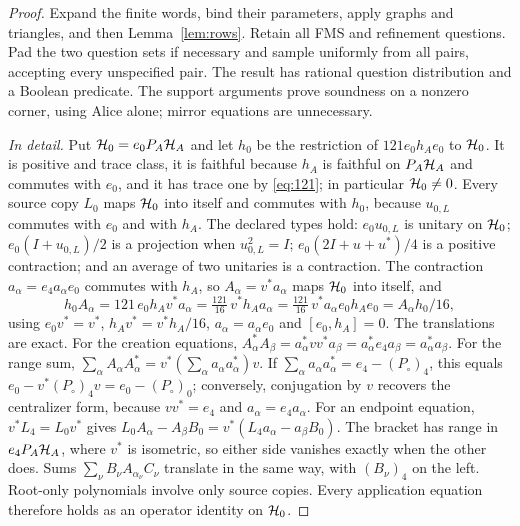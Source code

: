 \begin{proof}
Expand the finite words, bind their parameters, apply graphs and triangles, and then Lemma~\ref{lem:rows}. Retain all FMS and refinement questions. Pad the two question sets if necessary and sample uniformly from all pairs, accepting every unspecified pair. The result has rational question distribution and a Boolean predicate. The support arguments prove soundness on a nonzero corner, using Alice alone; mirror equations are unnecessary.

\emph{In detail.} Put $\mathcal H_0=e_0P_A\mathcal H_A$ and let $h_0$ be the restriction of $121e_0h_Ae_0$ to $\mathcal H_0$. It is positive and trace class, it is faithful because $h_A$ is faithful on $P_A\mathcal H_A$ and commutes with $e_0$, and it has trace one by \eqref{eq:121}; in particular $\mathcal H_0\ne0$. Every source copy $L_0$ maps $\mathcal H_0$ into itself and commutes with $h_0$, because $u_{0,L}$ commutes with $e_0$ and with $h_A$. The declared types hold: $e_0u_{0,L}$ is unitary on $\mathcal H_0$; $e_0(I+u_{0,L})/2$ is a projection when $u_{0,L}^2=I$; $e_0(2I+u+u^*)/4$ is a positive contraction; and an average of two unitaries is a contraction. The contraction $a_\alpha=e_4a_\alpha e_0$ commutes with $h_A$, so $A_\alpha=v^*a_\alpha$ maps $\mathcal H_0$ into itself, and
\[
 h_0A_\alpha=121\,e_0h_Av^*a_\alpha=\tfrac{121}{16}\,v^*h_Aa_\alpha=\tfrac{121}{16}\,v^*a_\alpha e_0h_Ae_0=A_\alpha h_0/16,
\]
using $e_0v^*=v^*$, $h_Av^*=v^*h_A/16$, $a_\alpha=a_\alpha e_0$ and $[e_0,h_A]=0$. The translations are exact. For the creation equations, $A_\alpha^*A_\beta=a_\alpha^*vv^*a_\beta=a_\alpha^*e_4a_\beta=a_\alpha^*a_\beta$. For the range sum, $\sum_\alpha A_\alpha A_\alpha^*=v^*(\sum_\alpha a_\alpha a_\alpha^*)v$. If $\sum_\alpha a_\alpha a_\alpha^*=e_4-(P_\circ)_4$, this equals $e_0-v^*(P_\circ)_4v=e_0-(P_\circ)_0$; conversely, conjugation by $v$ recovers the centralizer form, because $vv^*=e_4$ and $a_\alpha=e_4a_\alpha$. For an endpoint equation, $v^*L_4=L_0v^*$ gives $L_0A_\alpha-A_\beta B_0=v^*(L_4a_\alpha-a_\beta B_0)$. The bracket has range in $e_4P_A\mathcal H_A$, where $v^*$ is isometric, so either side vanishes exactly when the other does. Sums $\sum_\nu B_\nu A_{\alpha_\nu}C_\nu$ translate in the same way, with $(B_\nu)_4$ on the left. Root-only polynomials involve only source copies. Every application equation therefore holds as an operator identity on $\mathcal H_0$.


\end{proof}
